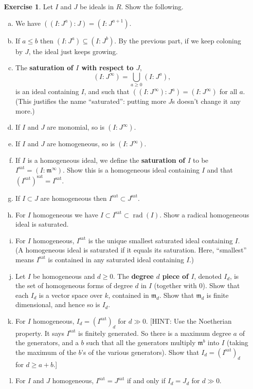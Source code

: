 \documentclass{amsart}
\theoremstyle{plain}
\theoremstyle{definition}
\newtheorem{exercise}[theorem]{Exercise}
\theoremstyle{definition}
\newcommand{\defining}[1]{\textbf{#1}}
\renewcommand{\colon}[3]{\ensuremath{\left(#1:_{#2} #3\right)}}
\DeclareMathOperator{\radname}{rad}
\newcommand{\rad}[1]{\radname(#1)}
\newcommand{\m}{\mathfrak{m}}
\begin{document}
\begin{exercise}
Let $I$ and $J$ be ideals in $R$.
Show the following.
\begin{enumerate}[a.]
\item We have $\colon{ \colon{I}{}{J^a} }{}{J} = \colon{I}{}{J^{a+1}}$.
\item If $a \leq b$ then $\colon{I}{}{J^a} \subseteq \colon{I}{}{J^b}$.
By the previous part, if we keep coloning by $J$, the ideal just keeps growing.
\item The \defining{saturation of $I$ with respect to $J$},
\[ \colon{I}{}{J^{\infty}} = \bigcup_{a \geq 0} \colon{I}{}{J^a} , \]
is an ideal containing $I$, and such that
$\colon{ \colon{I}{}{J^{\infty}} } {} {J^a} = \colon{I}{}{J^{\infty}}$ for all $a$.
(This justifies the name ``saturated'': putting more $J$s doesn't change it any more.)
\item If $I$ and $J$ are monomial, so is $\colon{I}{}{J^{\infty}}$.
\item If $I$ and $J$ are homogeneous, so is $\colon{I}{}{J^{\infty}}$.
\item If $I$ is a homogeneous ideal, we define the \defining{saturation of $I$}
to be $I^{\text{sat}} = \colon{I}{}{\m^{\infty}}$.
Show this is a homogeneous ideal containing $I$ and that $(I^{\text{sat}})^{\text{sat}} = I^{\text{sat}}$.
\item If $I \subset J$ are homogeneous then $I^{\text{sat}} \subset J^{\text{sat}}$.
\item For $I$ homogeneous we have $I \subset I^{\text{sat}} \subset \rad{I}$.
Show a radical homogeneous ideal is saturated.
\item For $I$ homogeneous, $I^{\text{sat}}$ is the unique smallest saturated
ideal containing $I$. (A homogeneous ideal is saturated if it equals its saturation.
Here, ``smallest'' means $I^{\text{sat}}$ is contained in any saturated ideal containing $I$.)
\item Let $I$ be homogeneous and $d \geq 0$.
The \defining{degree $d$ piece of $I$}, denoted $I_d$, is the set of homogeneous forms
of degree $d$ in $I$ (together with $0$).
Show that each $I_d$ is a vector space over $k$, contained in $\m_d$.
Show that $\m_d$ is finite dimensional, and hence so is $I_d$.
\item For $I$ homogeneous, $I_d = (I^{\text{sat}})_d$ for $d \gg 0$.
[HINT: Use the Noetherian property. It says $I^{\text{sat}}$ is finitely generated.
So there is a maximum degree $a$ of the generators, and a $b$
such that all the generators multiply $\m^b$ into $I$
(taking the maximum of the $b$'s of the various generators).
Show that $I_d = (I^{\text{sat}})_d$ for $d \geq a+b$.]
\item For $I$ and $J$ homogeneous, $I^{\text{sat}} = J^{\text{sat}}$
if and only if $I_d = J_d$ for $d \gg 0$.
\end{enumerate}
\end{exercise}
\end{document}
